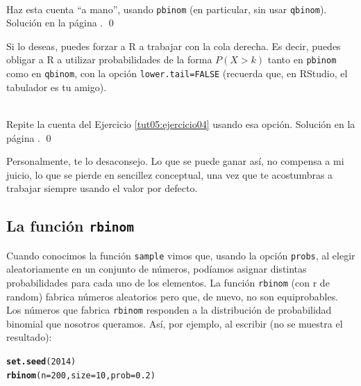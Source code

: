 \documentclass[10pt,a4paper]{article}\usepackage[]{graphicx}\usepackage[]{color}
\makeatletter
\newcommand{\hlnum}[1]{\textcolor[rgb]{0.686,0.059,0.569}{#1}}%
\newcommand{\hlstd}[1]{\textcolor[rgb]{0.345,0.345,0.345}{#1}}%
\newcommand{\hlkwc}[1]{\textcolor[rgb]{0.333,0.667,0.333}{#1}}%
\newcommand{\hlkwd}[1]{\textcolor[rgb]{0.737,0.353,0.396}{\textbf{#1}}}%
\newenvironment{kframe}{%
 \def\at@end@of@kframe{}%
 \ifinner\ifhmode%
  \def\at@end@of@kframe{\end{minipage}}%
  \begin{minipage}{\columnwidth}%
 \fi\fi%
 \def\FrameCommand##1{\hskip\@totalleftmargin \hskip-\fboxsep
 \colorbox{shadecolor}{##1}\hskip-\fboxsep
     \hskip-\linewidth \hskip-\@totalleftmargin \hskip\columnwidth}%
 \MakeFramed {\advance\hsize-\width
   \@totalleftmargin\z@ \linewidth\hsize
   \@setminipage}}%
 {\par\unskip\endMakeFramed%
 \at@end@of@kframe}
\newenvironment{knitrout}{}{} %
\makeatother
\begin{document}
\begin{ejercicio}
\label{tut05:ejercicio04}
\quad\\
Haz esta cuenta ``a mano'', usando {\tt pbinom} (en particular, sin usar {\tt qbinom}).
Solución en la página \pageref{tut05:ejercicio04:sol}.
\qed
\end{ejercicio}

Si lo deseas, puedes forzar a R a trabajar con la cola derecha. Es decir, puedes obligar a R a utilizar probabilidades de la forma $P(X>k)$ tanto en {\tt pbinom} como en {\tt qbinom}, con la opción {\tt lower.tail=FALSE} (recuerda que, en RStudio, el tabulador es tu amigo).

\begin{ejercicio}
\label{tut05:ejercicio05}
\quad\\
Repite la cuenta del Ejercicio \ref{tut05:ejercicio04} usando esa opción.
Solución en la página \pageref{tut05:ejercicio05:sol}.
\qed
\end{ejercicio}

Personalmente, te lo desaconsejo. Lo que se puede ganar así, no compensa a mi juicio, lo que se pierde en sencillez conceptual, una vez que te acostumbras a trabajar siempre usando el valor por defecto.


\subsection{La  función {\tt rbinom}}
\label{tut05:subsec:FuncionRbinom}

Cuando conocimos la función {\tt sample} vimos que, usando la opción {\tt probs}, al elegir aleatoriamente en un conjunto de números, podíamos asignar distintas probabilidades para cada uno de los elementos. La función {\tt rbinom} (con r de random) fabrica números aleatorios pero que, de nuevo, no son equiprobables. Los números que fabrica {\tt rbinom} responden a la distribución de probabilidad binomial que nosotros queramos. Así, por ejemplo, al escribir (no se muestra el resultado):

\begin{knitrout}
\color{fgcolor}\begin{kframe}
\begin{alltt}
\hlkwd{set.seed}\hlstd{(}\hlnum{2014}\hlstd{)}
\hlkwd{rbinom}\hlstd{(}\hlkwc{n}\hlstd{=}\hlnum{200}\hlstd{,} \hlkwc{size}\hlstd{=} \hlnum{10}\hlstd{,} \hlkwc{prob}\hlstd{=}\hlnum{0.2}\hlstd{)}
\end{alltt}
\end{kframe}
\end{knitrout}
\end{document}

